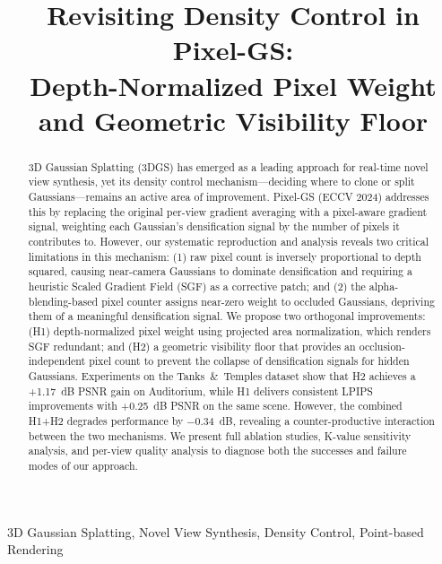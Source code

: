 \documentclass[conference]{IEEEtran}
\begin{document}
\title{Revisiting Density Control in Pixel-GS:\\Depth-Normalized Pixel Weight and Geometric Visibility Floor}

\author{
}

\maketitle

\begin{abstract}
3D Gaussian Splatting (3DGS) has emerged as a leading approach for real-time novel view synthesis, yet its density control mechanism—deciding where to clone or split Gaussians—remains an active area of improvement. Pixel-GS (ECCV 2024) addresses this by replacing the original per-view gradient averaging with a pixel-aware gradient signal, weighting each Gaussian's densification signal by the number of pixels it contributes to. However, our systematic reproduction and analysis reveals two critical limitations in this mechanism: (1) raw pixel count is inversely proportional to depth squared, causing near-camera Gaussians to dominate densification and requiring a heuristic Scaled Gradient Field (SGF) as a corrective patch; and (2) the alpha-blending-based pixel counter assigns near-zero weight to occluded Gaussians, depriving them of a meaningful densification signal. We propose two orthogonal improvements: (H1) depth-normalized pixel weight using projected area normalization, which renders SGF redundant; and (H2) a geometric visibility floor that provides an occlusion-independent pixel count to prevent the collapse of densification signals for hidden Gaussians. Experiments on the Tanks~\&~Temples dataset show that H2 achieves a +1.17~dB PSNR gain on Auditorium, while H1 delivers consistent LPIPS improvements with +0.25~dB PSNR on the same scene. However, the combined H1+H2 degrades performance by $-$0.34~dB, revealing a counter-productive interaction between the two mechanisms. We present full ablation studies, K-value sensitivity analysis, and per-view quality analysis to diagnose both the successes and failure modes of our approach.
\end{abstract}

\begin{IEEEkeywords}
3D Gaussian Splatting, Novel View Synthesis, Density Control, Point-based Rendering
\end{IEEEkeywords}
\end{document}
